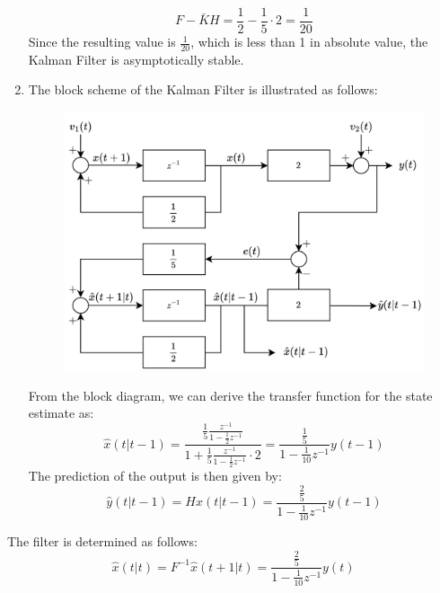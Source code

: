 \begin{example}
\begin{enumerate}
            \[F-\bar{K}H=\dfrac{1}{2}-\dfrac{1}{5}\cdot 2=\dfrac{1}{20}\]
            Since the resulting value is $\frac{1}{20}$, which is less than 1 in absolute value, the Kalman Filter is asymptotically stable. 
        \item The block scheme of the Kalman Filter is illustrated as follows:
            \begin{figure}[H]
                \centering
                \includegraphics[width=0.6\linewidth]{images/block3.png}
            \end{figure}
            From the block diagram, we can derive the transfer function for the state estimate as:
            \[\hat{x}(t|t-1)=\dfrac{\frac{1}{5}\frac{z^{-1}}{1-\frac{1}{2}z^{-1}}}{1+\frac{1}{5}\frac{z^{-1}}{1-\frac{1}{2}z^{-1}}\cdot 2}=\dfrac{\frac{1}{5}}{1-\frac{1}{10}z^{-1}}y(t-1)\]
            The prediction of the output is then given by:
            \[\hat{y}(t|t-1)=H\hat{x}(t|t-1)=\dfrac{\frac{2}{5}}{1-\frac{1}{10}z^{-1}}y(t-1)\]
    \end{enumerate}
    The filter is determined as follows:
    \[\hat{x}(t|t)=F^{-1}\hat{x}(t+1|t)=\dfrac{\frac{2}{5}}{1-\frac{1}{10}z^{-1}}y(t)\]
\end{example}